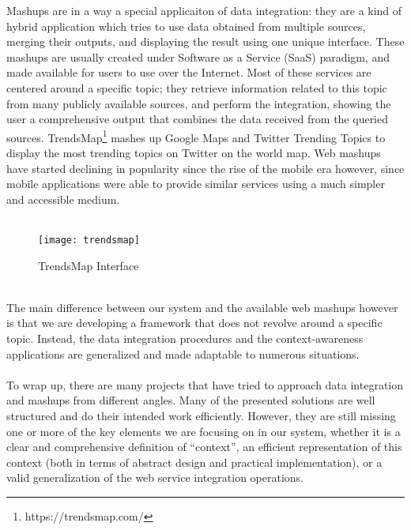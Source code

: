 Mashups are in a way a special applicaiton of data integration: they are a kind of hybrid application which tries to use data obtained from multiple sources, merging their outputs, and displaying the result using one unique interface. These mashups are usually created under Software as a Service (SaaS) paradigm, and made available for users to use over the Internet. Most of these services are centered around a specific topic; they retrieve information related to this topic from many publicly available sources, and perform the integration, showing the user a comprehensive output that combines the data received from the queried sources. TrendsMap\footnote{https://trendsmap.com/} mashes up Google Maps and Twitter Trending Topics to display the most trending topics on Twitter on the world map. Web mashups have started declining in popularity since the rise of the mobile era however, since mobile applications were able to provide similar services using a much simpler and accessible medium.\\\\
\pagebreak
\begin{figure}[h]
\centering
\texttt{[image: trendsmap]}
\caption{TrendsMap Interface}
\end{figure}
\\
The main difference between our system and the available web mashups however is that we are developing a framework that does not revolve around a specific topic. Instead, the data integration procedures and the context-awareness applications are generalized and made adaptable to numerous situations.\\\\
To wrap up, there are many projects that have tried to approach data integration and mashups from different angles. Many of the presented solutions are well structured and do their intended work efficiently. However, they are still missing one or more of the key elements we are focusing on in our system, whether it is a clear and comprehensive definition of ``context'', an efficient representation of this context (both in terms of abstract design and practical implementation), or a valid generalization of the web service integration operations.